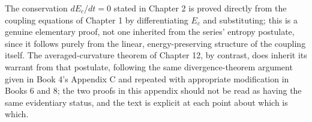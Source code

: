The conservation $dE_c/dt = 0$ stated in Chapter 2 is proved directly from the coupling equations of Chapter 1 by differentiating $E_c$ and substituting; this is a genuine elementary proof, not one inherited from the series' entropy postulate, since it follows purely from the linear, energy-preserving structure of the coupling itself. The averaged-curvature theorem of Chapter 12, by contrast, does inherit its warrant from that postulate, following the same divergence-theorem argument given in Book 4's Appendix C and repeated with appropriate modification in Books 6 and 8; the two proofs in this appendix should not be read as having the same evidentiary status, and the text is explicit at each point about which is which.

